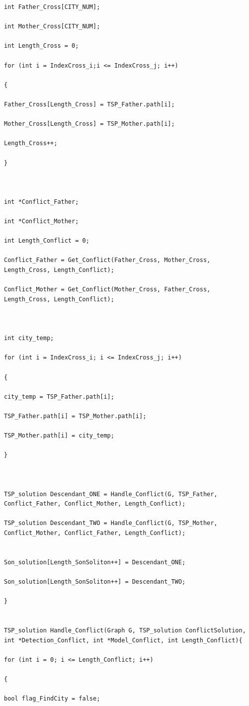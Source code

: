 \documentclass[a4paper,man,natbib]{apa6}
\begin{document}
\begin{lstlisting}
int Father_Cross[CITY_NUM];  

int Mother_Cross[CITY_NUM];   

int Length_Cross = 0;         

for (int i = IndexCross_i;i <= IndexCross_j; i++)  

{  

Father_Cross[Length_Cross] = TSP_Father.path[i];  

Mother_Cross[Length_Cross] = TSP_Mother.path[i];  

Length_Cross++;  

}  



int *Conflict_Father;      

int *Conflict_Mother;  

int Length_Conflict = 0;    

Conflict_Father = Get_Conflict(Father_Cross, Mother_Cross, Length_Cross, Length_Conflict);  

Conflict_Mother = Get_Conflict(Mother_Cross, Father_Cross, Length_Cross, Length_Conflict);  



int city_temp;  

for (int i = IndexCross_i; i <= IndexCross_j; i++)  

{  

city_temp = TSP_Father.path[i];  

TSP_Father.path[i] = TSP_Mother.path[i];  

TSP_Mother.path[i] = city_temp;  

}  



TSP_solution Descendant_ONE = Handle_Conflict(G, TSP_Father, Conflict_Father, Conflict_Mother, Length_Conflict);   

TSP_solution Descendant_TWO = Handle_Conflict(G, TSP_Mother, Conflict_Mother, Conflict_Father, Length_Conflict);     


Son_solution[Length_SonSoliton++] = Descendant_ONE;  

Son_solution[Length_SonSoliton++] = Descendant_TWO;  

}  


TSP_solution Handle_Conflict(Graph G, TSP_solution ConflictSolution, int *Detection_Conflict, int *Model_Conflict, int Length_Conflict){  

for (int i = 0; i <= Length_Conflict; i++)  

{  

bool flag_FindCity = false;  


\end{lstlisting}
\end{document}
